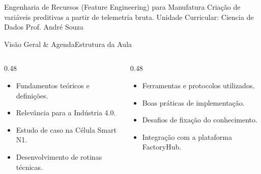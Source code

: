 
\senaicover
  {Engenharia de Recursos (Feature Engineering) para Manufatura}
  {Criação de variáveis preditivas a partir de telemetria bruta.}
  {Unidade Curricular: Ciencia de Dados}
  {Prof. André Souza}

\begin{senaiframe}{Visão Geral \& Agenda}{Estrutura da Aula}
  \begin{columns}[t]
    \begin{column}{0.48\textwidth}
      \begin{tcolorbox}[senaibluecard, title={1. Conceitos Chave}]
        \begin{itemize}
          \item Fundamentos teóricos e definições.
          \item Relevância para a Indústria 4.0.
        \end{itemize}
      \end{tcolorbox}
      \vspace{4pt}
      \begin{tcolorbox}[senaiambercard, title={3. Aplicação Prática}]
        \begin{itemize}
          \item Estudo de caso na Célula Smart N1.
          \item Desenvolvimento de rotinas técnicas.
        \end{itemize}
      \end{tcolorbox}
    \end{column}
    \begin{column}{0.48\textwidth}
      \begin{tcolorbox}[senairedcard, title={2. Detalhamento Técnico}]
        \begin{itemize}
          \item Ferramentas e protocolos utilizados.
          \item Boas práticas de implementação.
        \end{itemize}
      \end{tcolorbox}
      \vspace{4pt}
      \begin{tcolorbox}[senaigreencard, title={4. Exercícios \& Avaliação}]
        \begin{itemize}
          \item Desafios de fixação do conhecimento.
          \item Integração com a plataforma FactoryHub.
        \end{itemize}
      \end{tcolorbox}
    \end{column}
  \end{columns}
\end{senaiframe}

